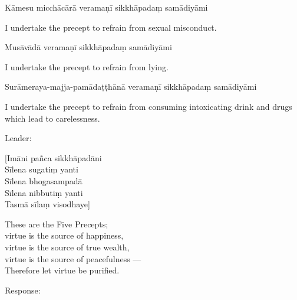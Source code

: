 \begin{precept}
  \setcounter{enumi}{2}
  \item Kāmesu micchācārā veramaṇī sikkhāpadaṃ samādiyāmi
\end{precept}

\begin{english}
  I undertake the precept to refrain from sexual misconduct.
\end{english}

\clearpage

\begin{precept}
  \setcounter{enumi}{3}
  \item Musāvādā veramaṇī sikkhāpadaṃ samādiyāmi
\end{precept}

\begin{english}
  I undertake the precept to refrain from lying.
\end{english}

\begin{precept}
  \setcounter{enumi}{4}
  \item Surāmeraya-majja-pamādaṭṭhānā veramaṇī sikkhāpadaṃ samādiyāmi
\end{precept}

\begin{english}
  I undertake the precept to refrain from consuming intoxicating drink and drugs which lead to carelessness.
\end{english}

\begin{instruction}
  Leader:
\end{instruction}

[Imāni pañca sikkhāpadāni\\
Sīlena sugatiṃ yanti\\
Sīlena bhogasampadā\\
Sīlena nibbutiṃ yanti\\
Tasmā sīlaṃ visodhaye]

\begin{english}
  These are the Five Precepts;\\
  virtue is the source of happiness,\\
  virtue is the source of true wealth,\\
  virtue is the source of peacefulness ---\\
  Therefore let virtue be purified.
\end{english}

\begin{instruction}
  Response:
\end{instruction}

